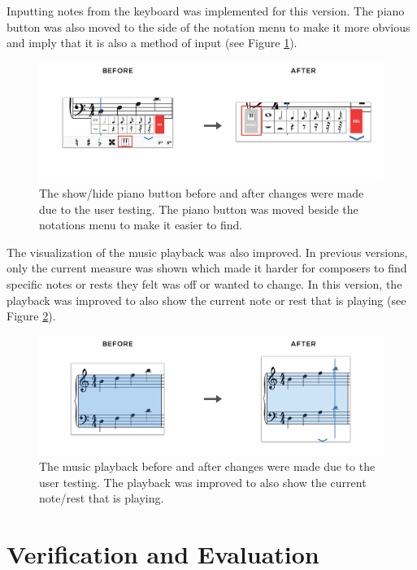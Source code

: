 				Inputting notes from the keyboard was implemented for this version. The piano button was also moved to the side of the notation menu to make it more obvious and imply that it is also a method of input (see Figure \ref{fig:before-after-pianobtn}). 

				\begin{figure}[h]
					\centering
					\includegraphics[scale=0.273]{figures/before-after-pianobtn.png}
				    \caption{The show/hide piano button before and after changes were made due to the user testing. The piano button was moved beside the notations menu to make it easier to find.}
				    \label{fig:before-after-pianobtn}
				\end{figure}

				The visualization of the music playback was also improved. In previous versions, only the current measure was shown which made it harder for composers to find specific notes or rests they felt was off or wanted to change. In this version, the playback was improved to also show the current note or rest that is playing (see Figure \ref{fig:before-after-playback}).

				\begin{figure}[h]
					\centering
					\includegraphics[scale=0.25]{figures/before-after-playback.png}
				    \caption{The music playback before and after changes were made due to the user testing. The playback was improved to also show the current note/rest that is playing.}
				    \label{fig:before-after-playback}
				\end{figure}

	\section{Verification and Evaluation}
